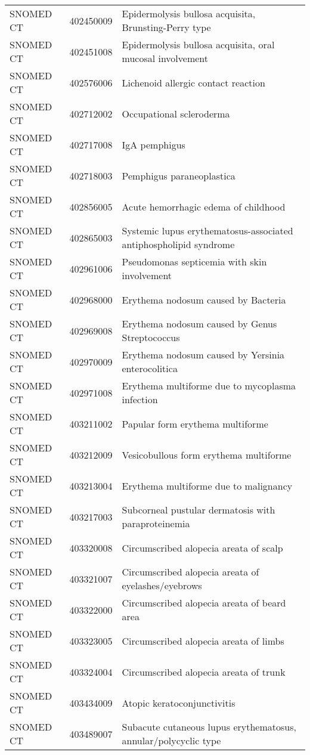 \begin{longtable}{p{}p{}p{}}
  SNOMED CT & 402450009 & Epidermolysis bullosa acquisita, Brunsting-Perry type \\ 
  SNOMED CT & 402451008 & Epidermolysis bullosa acquisita, oral mucosal involvement \\ 
  SNOMED CT & 402576006 & Lichenoid allergic contact reaction \\ 
  SNOMED CT & 402712002 & Occupational scleroderma \\ 
  SNOMED CT & 402717008 & IgA pemphigus \\ 
  SNOMED CT & 402718003 & Pemphigus paraneoplastica \\ 
  SNOMED CT & 402856005 & Acute hemorrhagic edema of childhood \\ 
  SNOMED CT & 402865003 & Systemic lupus erythematosus-associated antiphospholipid syndrome \\ 
  SNOMED CT & 402961006 & Pseudomonas septicemia with skin involvement \\ 
  SNOMED CT & 402968000 & Erythema nodosum caused by Bacteria \\ 
  SNOMED CT & 402969008 & Erythema nodosum caused by Genus Streptococcus \\ 
  SNOMED CT & 402970009 & Erythema nodosum caused by Yersinia enterocolitica \\ 
  SNOMED CT & 402971008 & Erythema multiforme due to mycoplasma infection \\ 
  SNOMED CT & 403211002 & Papular form erythema multiforme \\ 
  SNOMED CT & 403212009 & Vesicobullous form erythema multiforme \\ 
  SNOMED CT & 403213004 & Erythema multiforme due to malignancy \\ 
  SNOMED CT & 403217003 & Subcorneal pustular dermatosis with paraproteinemia \\ 
  SNOMED CT & 403320008 & Circumscribed alopecia areata of scalp \\ 
  SNOMED CT & 403321007 & Circumscribed alopecia areata of eyelashes/eyebrows \\ 
  SNOMED CT & 403322000 & Circumscribed alopecia areata of beard area \\ 
  SNOMED CT & 403323005 & Circumscribed alopecia areata of limbs \\ 
  SNOMED CT & 403324004 & Circumscribed alopecia areata of trunk \\ 
  SNOMED CT & 403434009 & Atopic keratoconjunctivitis \\ 
  SNOMED CT & 403489007 & Subacute cutaneous lupus erythematosus, annular/polycyclic type \\ 

\end{longtable}
